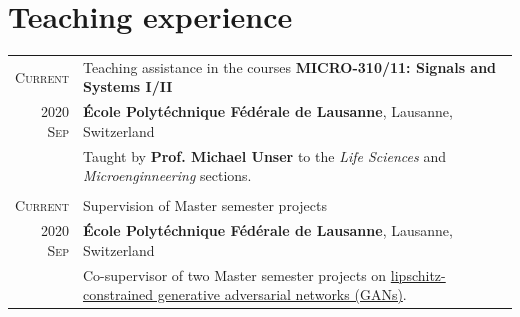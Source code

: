 \documentclass[a4paper,11pt]{article}
\begin{document}
\begin{tabular}{r|p{13cm}}
    \end{tabular}

  

  \vspace{15pt}

  \section{Teaching experience}

    \begin{tabular}{r|p{13cm}}

	  \textsc{Current}     & Teaching assistance in the courses \textbf{MICRO-310/11: Signals and Systems I/II} \\
	  \textsc{2020 Sep} & \footnotesize{\textbf{École Polytéchnique Fédérale de Lausanne}, Lausanne, Switzerland} \\
    & \footnotesize{Taught by \textbf{Prof. Michael Unser} to the \emph{Life Sciences} and \emph{Microenginneering} sections.} \\

    \multicolumn{2}{c}{} \\

    \textsc{Current}	 & Supervision of Master semester projects \\
    \textsc{2020 Sep}  & \footnotesize{\textbf{École Polytéchnique Fédérale de Lausanne}, Lausanne, Switzerland} \\
    & \footnotesize{Co-supervisor of two Master semester projects on \href{https://bigwww.epfl.ch/teaching/projects/abstract.html?f=00388}{lipschitz-constrained generative adversarial networks (GANs)}.} \\

    \end{tabular}

\end{document}
